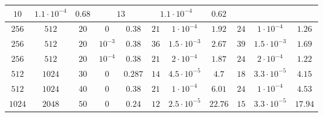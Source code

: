 \documentclass[twocolumn]{svjour3}
\begin{document}
\begin{table*}
\begin{center}
\begin{tabular}{|c|c|c|c|c|c|c|c|c|c|c|c|c|c}
\multicolumn{1}{|c}{$10$} & \multicolumn{1}{c}{$1.1 \cdot 10^{-4}$} & \multicolumn{1}{c|}{$0.68$} &
\multicolumn{2}{|c}{$13$} & \multicolumn{2}{c}{$1.1 \cdot 10^{-4}$} & \multicolumn{2}{c}{$\mathbf{0.62}$} \\
\hline
\multicolumn{1}{c}{$256$} & \multicolumn{1}{c}{$512$} & \multicolumn{1}{c}{$20$}  & \multicolumn{1}{c|}{$0$} & $ 0.38 $ & 
\multicolumn{1}{|c}{$21$} & \multicolumn{1}{c}{$1 \cdot 10^{-4}$} & \multicolumn{1}{c|}{$1.92$} &
\multicolumn{2}{|c}{$24$} & \multicolumn{2}{c}{$1 \cdot 10^{-4}$} & \multicolumn{2}{c}{$\mathbf{1.26}$} \\
\hline
\multicolumn{1}{c}{$256$} & \multicolumn{1}{c}{$512$} & \multicolumn{1}{c}{$20$}  & \multicolumn{1}{c|}{$10^{-3}$} & $ 0.38 $ & 
\multicolumn{1}{|c}{$36$} & \multicolumn{1}{c}{$1.5 \cdot 10^{-3}$} & \multicolumn{1}{c|}{$2.67$} &
\multicolumn{2}{|c}{$39$} & \multicolumn{2}{c}{$1.5 \cdot 10^{-3}$} & \multicolumn{2}{c}{$\mathbf{1.69}$} \\
\hline
\multicolumn{1}{c}{$256$} & \multicolumn{1}{c}{$512$} & \multicolumn{1}{c}{$20$}  & \multicolumn{1}{c|}{$10^{-4}$} & $ 0.38 $ & 
\multicolumn{1}{|c}{$21$} & \multicolumn{1}{c}{$2 \cdot 10^{-4}$} & \multicolumn{1}{c|}{$1.87$} &
\multicolumn{2}{|c}{$24$} & \multicolumn{2}{c}{$2 \cdot 10^{-4}$} & \multicolumn{2}{c}{$\mathbf{1.22}$} \\
\hline
\multicolumn{1}{c}{$512$} & \multicolumn{1}{c}{$1024$} & \multicolumn{1}{c}{$30$}  & \multicolumn{1}{c|}{$0$} & $ 0.287 $ & 
\multicolumn{1}{|c}{$14$} & \multicolumn{1}{c}{$4.5 \cdot 10^{-5}$} & \multicolumn{1}{c|}{$4.7$} &
\multicolumn{2}{|c}{$18$} & \multicolumn{2}{c}{$3.3 \cdot 10^{-5}$} & \multicolumn{2}{c}{$\mathbf{4.15}$} \\
\hline
\multicolumn{1}{c}{$512$} & \multicolumn{1}{c}{$1024$} & \multicolumn{1}{c}{$40$}  & \multicolumn{1}{c|}{$0$} & $ 0.38 $ & 
\multicolumn{1}{|c}{$21$} & \multicolumn{1}{c}{$1\cdot 10^{-4}$} & \multicolumn{1}{c|}{$6.01$} &
\multicolumn{2}{|c}{$24$} & \multicolumn{2}{c}{$1 \cdot 10^{-4}$} & \multicolumn{2}{c}{$\mathbf{4.53}$} \\
\hline
\multicolumn{1}{c}{$1024$} & \multicolumn{1}{c}{$2048$} & \multicolumn{1}{c}{$50$}  & \multicolumn{1}{c|}{$0$} & $ 0.24 $ & 
\multicolumn{1}{|c}{$12$} & \multicolumn{1}{c}{$2.5\cdot 10^{-5}$} & \multicolumn{1}{c|}{$22.76$} &
\multicolumn{2}{|c}{$15$} & \multicolumn{2}{c}{$3.3 \cdot 10^{-5}$} & \multicolumn{2}{c}{$\mathbf{17.94}$} \\
\hline
\end{tabular}
\end{center}
\end{table*}
\end{document}
